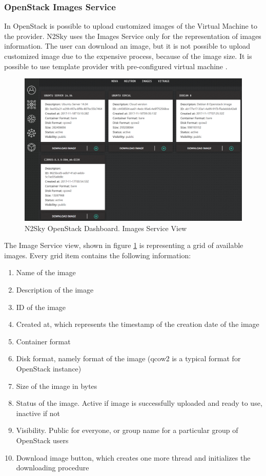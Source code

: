 \subsubsection{OpenStack Images Service}\label{OpenStack Images Service}

In OpenStack is possible to upload customized images of the Virtual Machine to the provider. N2Sky uses the Images Service only for the representation of images information. The user can download an image, but it is not possible to upload customized image due to the expensive process, because of the image size. It is possible to use template provider with pre-configured virtual machine \cite{images}. 


\begin{figure}[H]
\begin{center}
  \includegraphics[width=\linewidth]{components/4/pics/openstack_images.png}
  \caption{N2Sky OpenStack Dashboard. Images Service View}
  \label{fig:openstack_images}
\end{center}
\end{figure}

The Image Service view, shown in figure \ref{fig:openstack_images} is representing a grid of available images. Every grid item contains the following information: 
\begin{enumerate}
\item Name of the image
\item Description of the image
\item ID of the image
\item Created at, which represents the timestamp of the creation date of the image
\item Container format
\item Disk format, namely format of the image (qcow2 is a typical format for OpenStack instance)
\item Size of the image in bytes
\item Status of the image. Active if image is successfully uploaded and ready to use, inactive if not
\item Visibility. Public for everyone, or group name for a particular group of OpenStack users
\item Download image button, which creates one more thread and initializes the downloading procedure
\end{enumerate}

